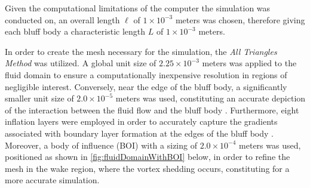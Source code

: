 Given the computational limitations of the computer the simulation was conducted on, an overall length $\ell$ of $1\times{10}^{-3}$ meters was chosen, therefore giving each bluff body a characteristic length $L$ of $1\times{10}^{-3}$ meters. 

In order to create the mesh necessary for the simulation, the \textit{All Triangles Method} was utilized. A global unit size of $2.25\times{10}^{-3}$ meters was applied to the fluid domain to ensure a computationally inexpensive resolution in regions of negligible interest. Conversely, near the edge of the bluff body, a significantly smaller unit size of $2.0\times{10}^{-5}$ meters was used, constituting an accurate depiction of the interaction between the fluid flow and the bluff body \parencite{ansys_learning_best_2023}. Furthermore, eight inflation layers were employed in order to accurately capture the gradients associated with boundary layer formation at the edges of the bluff body \parencite{fluid_mechanics_101_cfd_2021}. Moreover, a body of influence (BOI) with a sizing of $2.0\times{10}^{-4}$ meters was used, positioned as shown in \ref{fig:fluidDomainWithBOI} below, in order to refine the mesh in the wake region, where the vortex shedding occurs, constituting for a more accurate simulation.  

